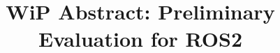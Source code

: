 \documentclass{sig-alternate-ipsn13}
\begin{document}
\title{WiP Abstract: Preliminary Evaluation for ROS2}
%
%
%
%
%
\end{document}
